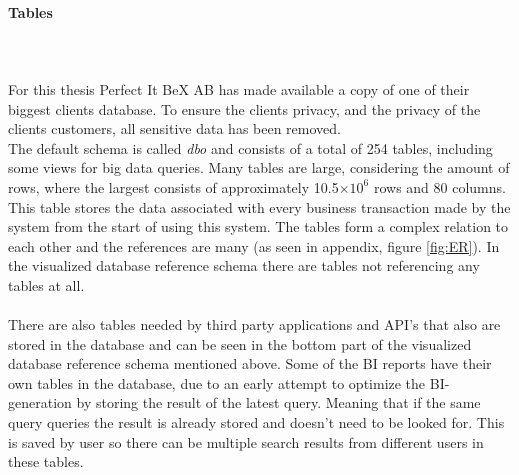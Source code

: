 \documentclass{cslthse-msc}
\begin{document}
\paragraph*{Tables}\mbox{}\\\\
For this thesis Perfect It BeX AB has made available a copy of one of their biggest clients database. To ensure the clients privacy, and the privacy of the clients customers, all sensitive data has been removed. \\ 
The default schema is called \textit{dbo} and consists of a total of 254 tables, including some views for big data queries. Many tables are large, considering the amount of rows, where the largest consists of approximately 10.5$\times 10^6$ rows and 80 columns. This table stores the data associated with every business transaction made by the system from the start of using this system. The tables form a complex relation to each other and the references are many (as seen in appendix, figure \ref{fig:ER}). In the visualized database reference schema there are tables not referencing any tables at all.\\\\
There are also tables needed by third party applications and API's that also are stored in the database and can be seen in the bottom part of the visualized database reference schema mentioned above. Some of the BI reports have their own tables in the database, due to an early attempt to optimize the BI-generation by storing the result of the latest query. Meaning that if the same query queries the result is already stored and doesn't need to be looked for. This is saved by user so there can be multiple search results from different users in these tables.
\end{document}
